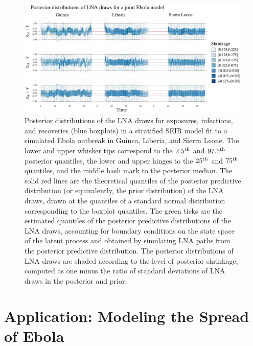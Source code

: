 \begin{figure}
	\begin{fullpage}
		\centering
		\includegraphics[width=\linewidth]{figures/ebola_synth_drawplots}
		\caption[Posterior distributions of LNA draws for a stratified SEIR model fit to a simulated Ebola outbreak.]{Posterior distributions of the LNA draws for exposures, infections, and recoveries (blue boxplots) in a stratified SEIR model fit to a simulated Ebola outbreak in Guinea, Liberia, and Sierra Leone. The lower and upper whisker tips correspond to the $ 2.5^{\mathrm{th}} $ and $ 97.5^{\mathrm{th}} $ posterior quantiles, the lower and upper hinges to the $ 25^{\mathrm{th}} $ and $ 75^{\mathrm{th}} $ quantiles, and the middle hash mark to the posterior median. The solid red lines are the theoretical quantiles of the posterior predictive distribution (or equivalently, the prior distribution) of the LNA draws, drawn at the quantiles of a standard normal distribution corresponding to the boxplot quantiles. The green ticks are the estimated quantiles of the posterior predictive distributions of the LNA draws, accounting for boundary conditions on the state space of the latent process and obtained by simulating LNA paths from the posterior predictive distribution.  The posterior distributions of LNA draws are shaded according to the level of posterior shrinkage, computed as one minus the ratio of standard deviations of LNA draws in the posterior and prior.}
		\label{fig:ebola_synth_drawplots}
	\end{fullpage}
\end{figure}

\newpage
\section{Application: Modeling the Spread of Ebola}
\label{sec:lna_ebola}

